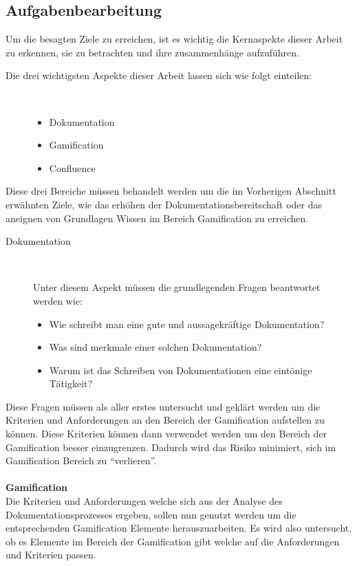 \documentclass[a4paper,12pt]{scrartcl}
\begin{document}
\subsection{Aufgabenbearbeitung} 
Um die besagten Ziele zu erreichen, ist es wichtig die Kernaspekte dieser Arbeit zu erkennen, sie zu betrachten und ihre zusammenhänge aufzuführen.
\begin{description}
   \item[Die drei wichtigsten Aspekte dieser Arbeit lassen sich wie folgt einteilen:]~\par
   \begin{itemize}
      \item Dokumentation
      \item Gamification
      \item Confluence
   \end{itemize}
\end{description}
Diese drei Bereiche müssen behandelt werden um die im Vorherigen Abschnitt erwähnten Ziele, wie das erhöhen der Dokumentationsbereitschaft oder das aneignen von Grundlagen Wissen im Bereich Gamification zu erreichen.
\begin{description}
   \item[Dokumentation]~\par
Unter diesem Aspekt müssen die grundlegenden Fragen beantwortet werden wie:
   \begin{itemize}
      \item Wie schreibt man eine gute und aussagekräftige Dokumentation?
      \item Was sind merkmale einer solchen Dokumentation?
      \item Warum ist das Schreiben von Dokumentationen eine eintönige Tätigkeit?
   \end{itemize}
\end{description}
Diese Fragen müssen als aller erstes untersucht und geklärt werden um die Kriterien und Anforderungen an den Bereich der Gamification aufstellen zu können. Diese Kriterien können dann verwendet werden um den Bereich der Gamification besser einzugrenzen. Dadurch wird das Risiko minimiert, sich im Gamification Bereich zu “verlieren”. 
\\\\
\textbf{Gamification}\\
Die Kriterien und Anforderungen welche sich aus der Analyse des Dokumentationsprozesses ergeben, sollen nun genutzt werden um die entsprechenden Gamification Elemente herauszuarbeiten. Es wird also untersucht, ob es Elemente im Bereich der Gamification gibt welche auf die Anforderungen und Kriterien passen.
\end{document}
